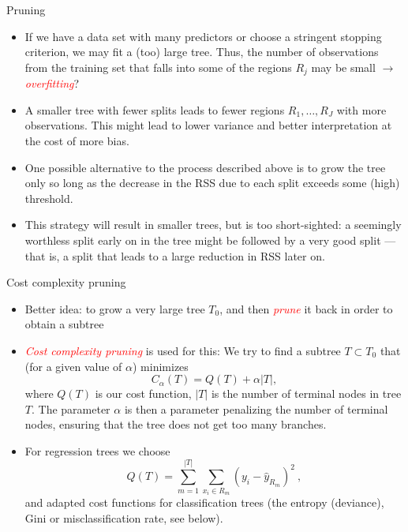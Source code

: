 \documentclass[10pt,ignorenonframetext,]{beamer}
\begin{document}
\begin{frame}{Pruning}

\begin{itemize}
\item
  If we have a data set with many predictors or choose a stringent
  stopping criterion, we may fit a (too) large tree. Thus, the number of
  observations from the training set that falls into some of the regions
  \(R_j\) may be small \(\rightarrow\)
  \emph{\textcolor{red}{overfitting}}?
\item
  A smaller tree with fewer splits leads to fewer regions
  \(R_1, \ldots, R_J\) with more observations. This might lead to lower
  variance and better interpretation at the cost of more bias.
\item
  One possible alternative to the process described above is to grow the
  tree only so long as the decrease in the RSS due to each split exceeds
  some (high) threshold.
\item
  This strategy will result in smaller trees, but is too short-sighted:
  a seemingly worthless split early on in the tree might be followed by
  a very good split --- that is, a split that leads to a large reduction
  in RSS later on.
\end{itemize}

\end{frame}

\begin{frame}

\begin{block}{Cost complexity pruning}

\begin{itemize}
\item
  Better idea: to grow a very large tree \(T_0\), and then
  \emph{\textcolor{red}{prune}} it back in order to obtain a subtree
\item
  \emph{\textcolor{red}{Cost complexity pruning}} is used for this: We
  try to find a subtree \(T\subset T_0\) that (for a given value of
  \(\alpha\)) minimizes \[
  C_{\alpha}(T)=Q(T)+\alpha |T|,
  \] where \(Q(T)\) is our cost function, \(|T|\) is the number of
  terminal nodes in tree \(T\). The parameter \(\alpha\) is then a
  parameter penalizing the number of terminal nodes, ensuring that the
  tree does not get too many branches.
\item
  For regression trees we choose
  \[Q(T)=\sum_{m=1}^{|T|}\sum_{x_i\in R_m}(y_i - \hat{y}_{R_m})^2 \ ,\]
  and adapted cost functions for classification trees (the entropy
  (deviance), Gini or misclassification rate, see below).
\end{itemize}

\end{block}

\end{frame}
\end{document}
